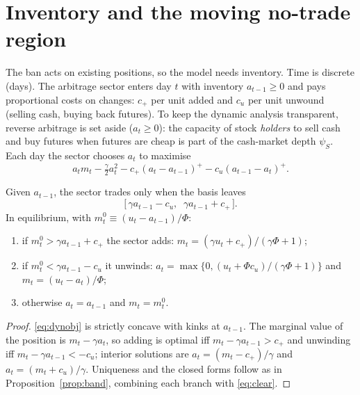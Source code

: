 \section{Inventory and the moving no-trade region}\label{sec:inv}
The ban acts on existing positions, so the model needs inventory. Time is discrete (days). The arbitrage sector enters
day $t$ with inventory $a_{t-1}\ge 0$ and pays proportional costs on changes: $c_+$ per unit added and $c_u$ per unit
unwound (selling cash, buying back futures). To keep the dynamic analysis transparent, reverse arbitrage is set aside
($a_t\ge 0$): the capacity of stock \emph{holders} to sell cash and buy futures when futures are cheap is part of the
cash-market depth $\psi_S$. Each day the sector chooses $a_t$ to maximise
\begin{equation}\label{eq:dynobj}
a_t m_t-\tfrac{\gamma}{2}a_t^2 - c_+(a_t-a_{t-1})^+ - c_u(a_{t-1}-a_t)^+ .
\end{equation}

\begin{proposition}\label{prop:inv}
Given $a_{t-1}$, the sector trades only when the basis leaves
\begin{equation}
\big[\,\gamma a_{t-1}-c_u,\;\; \gamma a_{t-1}+c_+\,\big].
\end{equation}
In equilibrium, with $m^0_t\equiv(u_t-a_{t-1})/\Phi$:
\begin{enumerate}[label=(\alph*),leftmargin=1.8em,itemsep=1pt]
\item if $m^0_t>\gamma a_{t-1}+c_+$ the sector adds: $m_t=(\gamma u_t+c_+)/(\gamma\Phi+1)$;
\item if $m^0_t<\gamma a_{t-1}-c_u$ it unwinds: $a_t=\max\{0,(u_t+\Phi c_u)/(\gamma\Phi+1)\}$ and $m_t=(u_t-a_t)/\Phi$;
\item otherwise $a_t=a_{t-1}$ and $m_t=m^0_t$.
\end{enumerate}
\end{proposition}
\begin{proof}
\eqref{eq:dynobj} is strictly concave with kinks at $a_{t-1}$. The marginal value of the position is $m_t-\gamma a_t$, so
adding is optimal iff $m_t-\gamma a_{t-1}>c_+$ and unwinding iff $m_t-\gamma a_{t-1}<-c_u$; interior solutions are
$a_t=(m_t-c_+)/\gamma$ and $a_t=(m_t+c_u)/\gamma$. Uniqueness and the closed forms follow as in
Proposition~\ref{prop:band}, combining each branch with \eqref{eq:clear}.
\end{proof}

